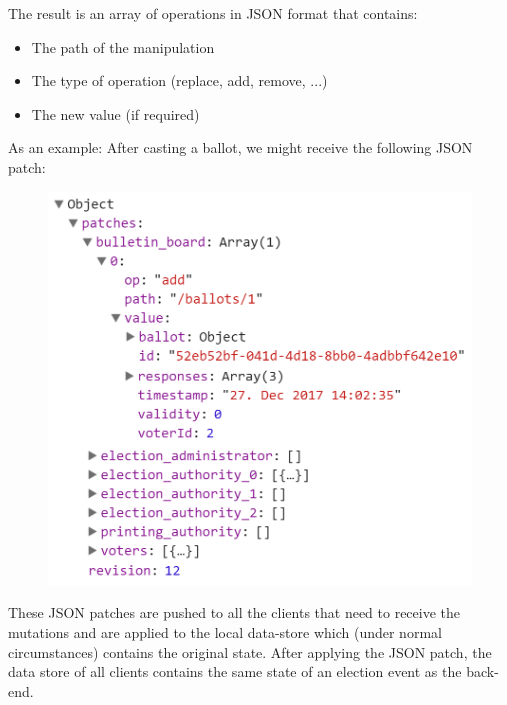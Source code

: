 The result is an array of operations in JSON format that contains:
\begin{itemize}
	\item The path of the manipulation
	\item The type of operation (replace, add, remove, ...)
	\item The new value (if required)
\end{itemize}

As an example: After casting a ballot, we might receive the following JSON patch:

\begin{figure}
\begin{center}
\includegraphics[scale=0.6]{assets/jsonpatchexample.png}
\label{JSON Patch example}%
\end{center}
\end{figure}
These JSON patches are pushed to all the clients that need to receive the mutations and are applied to the local data-store which (under normal circumstances) contains the original state. After applying the JSON patch, the data store of all clients contains the same state of an election event as the back-end.

